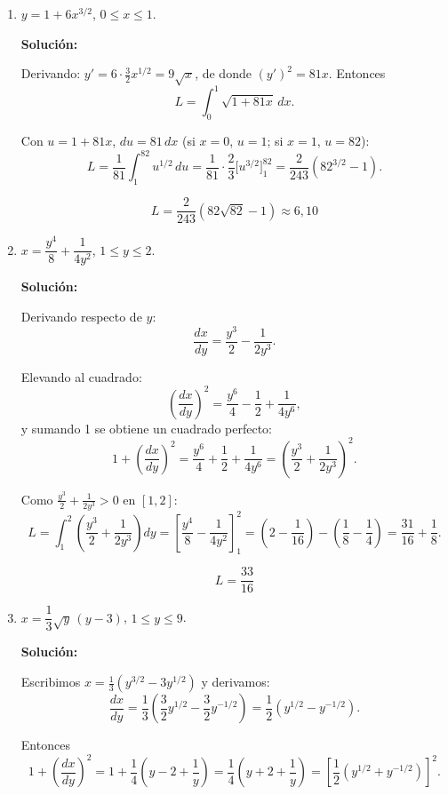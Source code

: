 \documentclass[12pt]{article}
\newcommand{\solucion}{%
    \vspace{0.8em}%
    \textbf{Solución:}%
}
\begin{document}
\begin{enumerate}[label=\alph*.-]

    \item $y=1+6x^{3/2}$, \quad $0\le x\le1$.

    \solucion

    Derivando: $y'=6\cdot\frac32x^{1/2}=9\sqrt x$, de donde
    $(y')^2=81x$. Entonces
    \[
    L=\int_{0}^{1}\sqrt{1+81x}\,dx.
    \]

    Con $u=1+81x$, $du=81\,dx$ (si $x=0$, $u=1$; si $x=1$, $u=82$):
    \[
    L=\frac{1}{81}\int_{1}^{82}u^{1/2}\,du
    =\frac{1}{81}\cdot\frac23\Big[u^{3/2}\Big]_{1}^{82}
    =\frac{2}{243}\left(82^{3/2}-1\right).
    \]

    \[
    \boxed{
    L=\frac{2}{243}\left(82\sqrt{82}-1\right)\approx6{,}10
    }
    \]


    \item $x=\dfrac{y^4}{8}+\dfrac{1}{4y^2}$, \quad $1\le y\le2$.

    \solucion

    Derivando respecto de $y$:
    \[
    \frac{dx}{dy}=\frac{y^3}{2}-\frac{1}{2y^3}.
    \]

    Elevando al cuadrado:
    \[
    \left(\frac{dx}{dy}\right)^2=\frac{y^6}{4}-\frac12+\frac{1}{4y^6},
    \]
    y sumando 1 se obtiene un cuadrado perfecto:
    \[
    1+\left(\frac{dx}{dy}\right)^2=\frac{y^6}{4}+\frac12+\frac{1}{4y^6}
    =\left(\frac{y^3}{2}+\frac{1}{2y^3}\right)^2.
    \]

    Como $\frac{y^3}{2}+\frac{1}{2y^3}>0$ en $[1,2]$:
    \[
    L=\int_{1}^{2}\left(\frac{y^3}{2}+\frac{1}{2y^3}\right)dy
    =\left[\frac{y^4}{8}-\frac{1}{4y^2}\right]_{1}^{2}
    =\left(2-\frac{1}{16}\right)-\left(\frac18-\frac14\right)
    =\frac{31}{16}+\frac18.
    \]

    \[
    \boxed{
    L=\frac{33}{16}
    }
    \]


    \item $x=\dfrac13\sqrt y\,(y-3)$, \quad $1\le y\le9$.

    \solucion

    Escribimos $x=\frac13\left(y^{3/2}-3y^{1/2}\right)$ y derivamos:
    \[
    \frac{dx}{dy}=\frac13\left(\frac32y^{1/2}-\frac32y^{-1/2}\right)
    =\frac12\left(y^{1/2}-y^{-1/2}\right).
    \]

    Entonces
    \[
    1+\left(\frac{dx}{dy}\right)^2
    =1+\frac14\left(y-2+\frac1y\right)
    =\frac14\left(y+2+\frac1y\right)
    =\left[\frac12\left(y^{1/2}+y^{-1/2}\right)\right]^2.
    \]


\end{enumerate}
\end{document}
